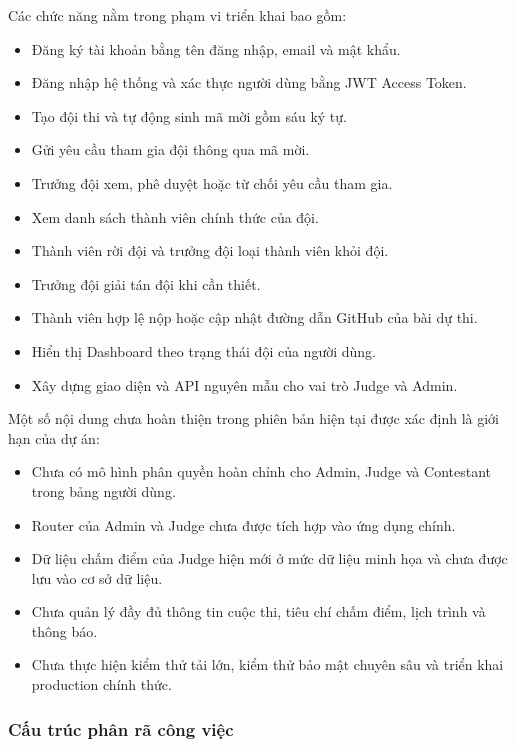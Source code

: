 Các chức năng nằm trong phạm vi triển khai bao gồm:

\begin{itemize}
    \item Đăng ký tài khoản bằng tên đăng nhập, email và mật khẩu.
    \item Đăng nhập hệ thống và xác thực người dùng bằng JWT Access Token.
    \item Tạo đội thi và tự động sinh mã mời gồm sáu ký tự.
    \item Gửi yêu cầu tham gia đội thông qua mã mời.
    \item Trưởng đội xem, phê duyệt hoặc từ chối yêu cầu tham gia.
    \item Xem danh sách thành viên chính thức của đội.
    \item Thành viên rời đội và trưởng đội loại thành viên khỏi đội.
    \item Trưởng đội giải tán đội khi cần thiết.
    \item Thành viên hợp lệ nộp hoặc cập nhật đường dẫn GitHub của bài dự thi.
    \item Hiển thị Dashboard theo trạng thái đội của người dùng.
    \item Xây dựng giao diện và API nguyên mẫu cho vai trò Judge và Admin.
\end{itemize}

Một số nội dung chưa hoàn thiện trong phiên bản hiện tại được xác định là giới hạn của dự án:

\begin{itemize}
    \item Chưa có mô hình phân quyền hoàn chỉnh cho Admin, Judge và Contestant trong bảng người dùng.
    \item Router của Admin và Judge chưa được tích hợp vào ứng dụng chính.
    \item Dữ liệu chấm điểm của Judge hiện mới ở mức dữ liệu minh họa và chưa được lưu vào cơ sở dữ liệu.
    \item Chưa quản lý đầy đủ thông tin cuộc thi, tiêu chí chấm điểm, lịch trình và thông báo.
    \item Chưa thực hiện kiểm thử tải lớn, kiểm thử bảo mật chuyên sâu và triển khai production chính thức.
\end{itemize}

\subsubsection{Cấu trúc phân rã công việc}

